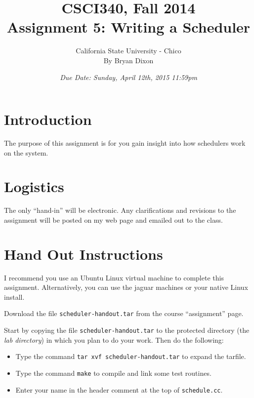 \documentclass[11pt]{article}
\begin{document}
\title{CSCI340, Fall 2014\\
Assignment 5: Writing a Scheduler
}

\author{California State University - Chico\\
  By Bryan Dixon\\
}
\date{\emph{Due Date: Sunday, April 12th, 2015 11:59pm}}


\maketitle

\section*{Introduction}
The purpose of this assignment is for you gain insight into how schedulers work on the system. 

\section*{Logistics}

The only ``hand-in'' will be
electronic.  Any clarifications and revisions to the assignment will
be posted on my web page and emailed out to the class.

\section*{Hand Out Instructions}

I recommend you use an Ubuntu Linux virtual machine to complete this
assignment.  Alternatively, you can use the jaguar machines or your native Linux install. 

Download the file \texttt{scheduler-handout.tar} from the course
``assignment'' page.

Start by copying the file {\tt scheduler-handout.tar}
to the protected directory (the {\em lab directory}) in which you plan
to do your work.  Then do the following:

\begin{itemize}
\item Type the command {\tt tar xvf scheduler-handout.tar} 
to expand the tarfile.

\item Type the command {\tt make} to compile and link some
test routines.

\item Enter your name in the header
comment at the top of {\tt schedule.cc}.

\end{itemize}
\end{document}
